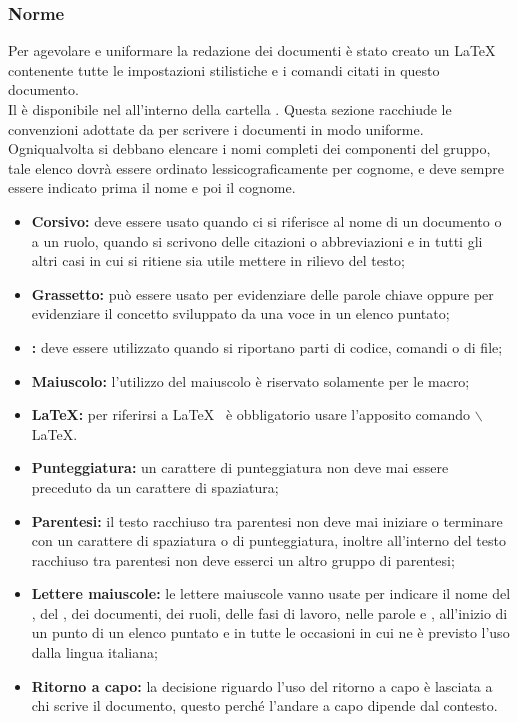\subsubsection{Norme}
Per agevolare e uniformare la redazione dei documenti è stato creato un  \LaTeX~ contenente tutte le impostazioni stilistiche e i comandi citati in questo documento.\\
Il  è disponibile nel  \texttt{\pragmaDocs} all'interno della cartella \texttt{}.
\label{normeTipografiche}
Questa sezione racchiude le convenzioni adottate da \gruppo per scrivere i documenti in modo uniforme.
\label{norNome}
Ogniqualvolta si debbano elencare i nomi completi dei componenti del gruppo, tale elenco dovrà essere ordinato lessicograficamente per cognome, e deve sempre essere indicato prima il nome e poi il cognome.
\begin{itemize}
\item \textbf{Corsivo:} deve essere usato quando ci si riferisce al nome di un documento o a un ruolo, quando si scrivono delle citazioni o abbreviazioni e in tutti gli altri casi in cui si ritiene sia utile mettere in rilievo del testo;
\item \textbf{Grassetto:} può essere usato per evidenziare delle parole chiave oppure per evidenziare il concetto sviluppato da una voce in un elenco puntato;
\item \textbf{:} deve essere utilizzato quando si riportano parti di codice, comandi o  di file;
\item \textbf{Maiuscolo:} l'utilizzo del maiuscolo è riservato solamente per le macro;
\item \textbf{\LaTeX:} per riferirsi a \LaTeX~ è obbligatorio usare l'apposito comando $\backslash$LaTeX.
\end{itemize}
\begin{itemize}
\item \textbf{Punteggiatura:} un carattere di punteggiatura non deve mai essere preceduto da un carattere di spaziatura;
\item \textbf{Parentesi:} il testo racchiuso tra parentesi non deve mai iniziare o terminare con un carattere di spaziatura o di punteggiatura, inoltre all'interno del testo racchiuso tra parentesi non deve esserci un altro gruppo di parentesi;
\item \textbf{Lettere maiuscole:} le lettere maiuscole vanno usate per indicare il nome del , del , dei documenti, dei ruoli, delle fasi di lavoro, nelle parole  e , all'inizio di un punto di un elenco puntato e in tutte le occasioni in cui ne è previsto l'uso dalla lingua italiana;
\item \textbf{Ritorno a capo:} la decisione riguardo l'uso del ritorno a capo è lasciata a chi scrive il documento, questo perché l'andare a capo dipende dal contesto.
\end{itemize}
